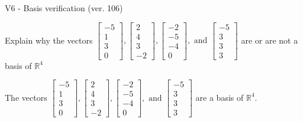 \begin{exercise}
  \begin{exerciseTitle}V6 - Basis verification (ver. 106)\end{exerciseTitle}
  \begin{exerciseStatement}
    Explain why the vectors \(\left[\begin{array}{r}
-5 \\
1 \\
3 \\
0
\end{array}\right] , \left[\begin{array}{r}
2 \\
4 \\
3 \\
-2
\end{array}\right] , \left[\begin{array}{r}
-2 \\
-5 \\
-4 \\
0
\end{array}\right] , \text{ and } \left[\begin{array}{r}
-5 \\
3 \\
3 \\
3
\end{array}\right]\) are or are not a basis of \(\mathbb{R}^4\)	


  \end{exerciseStatement}
  \begin{exerciseAnswer}
   The vectors \(\left[\begin{array}{r}
-5 \\
1 \\
3 \\
0
\end{array}\right] , \left[\begin{array}{r}
2 \\
4 \\
3 \\
-2
\end{array}\right] , \left[\begin{array}{r}
-2 \\
-5 \\
-4 \\
0
\end{array}\right] , \text{ and } \left[\begin{array}{r}
-5 \\
3 \\
3 \\
3
\end{array}\right]\) 
  	 are  a basis of \(\mathbb{R}^4\).
  


  \end{exerciseAnswer}
\end{exercise}